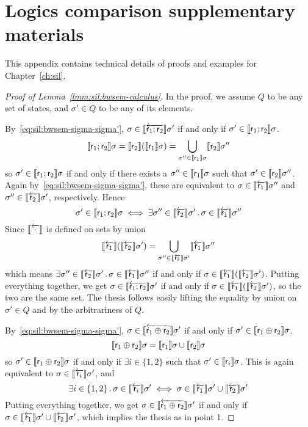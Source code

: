 
\chapter{Logics comparison supplementary materials}\label{ch:app:sil}
This appendix contains technical details of proofs and examples for Chapter~\ref{ch:sil}.

\begin{proof}[Proof of Lemma~\ref{lmm:sil:bwsem-calculus}]
	In the proof, we assume $Q$ to be any set of states, and $\sigma' \in Q$ to be any of its elements.

	By~\eqref{eq:sil:bwsem-sigma-sigma'}, $\sigma \in \llbracket\overleftarrow{\mathsf{r}_1; \mathsf{r}_2}\rrbracket \sigma'$ if and only if $\sigma' \in \llbracket\mathsf{r}_1; \mathsf{r}_2\rrbracket \sigma$.
	\[
	\llbracket\mathsf{r}_1; \mathsf{r}_2\rrbracket \sigma = \llbracket\mathsf{r}_2\rrbracket (\llbracket\mathsf{r}_1\rrbracket \sigma) = \bigcup\limits_{\sigma'' \in \llbracket\mathsf{r}_1\rrbracket \sigma} \llbracket\mathsf{r}_2\rrbracket \sigma''
	\]
	so $\sigma' \in \llbracket\mathsf{r}_1; \mathsf{r}_2\rrbracket \sigma$ if and only if there exists a $\sigma'' \in \llbracket\mathsf{r}_1\rrbracket \sigma$ such that $\sigma' \in \llbracket\mathsf{r}_2\rrbracket \sigma''$. Again by~\eqref{eq:sil:bwsem-sigma-sigma'}, these are equivalent to $\sigma \in \llbracket\overleftarrow{\mathsf{r}_1}\rrbracket \sigma''$ and $\sigma'' \in \llbracket\overleftarrow{\mathsf{r}_2}\rrbracket \sigma'$, respectively. Hence
	\[
	\sigma' \in \llbracket\mathsf{r}_1; \mathsf{r}_2\rrbracket \sigma \iff \exists \sigma'' \in \llbracket\overleftarrow{\mathsf{r}_2}\rrbracket \sigma' \,.\, \sigma \in \llbracket\overleftarrow{\mathsf{r}_1}\rrbracket \sigma''
	\]
	Since $\llbracket\overleftarrow{\cdot}\rrbracket$ is defined on sets by union
	\[
	\llbracket\overleftarrow{\mathsf{r}_1}\rrbracket (\llbracket\overleftarrow{\mathsf{r}_2}\rrbracket \sigma') = \bigcup\limits_{\sigma'' \in \llbracket\overleftarrow{\mathsf{r}_2}\rrbracket \sigma'} \llbracket\overleftarrow{\mathsf{r}_1}\rrbracket \sigma''
	\]
	which means $\exists \sigma'' \in \llbracket\overleftarrow{\mathsf{r}_2}\rrbracket \sigma' \,.\, \sigma \in \llbracket\overleftarrow{\mathsf{r}_1}\rrbracket \sigma''$ if and only if $\sigma \in \llbracket\overleftarrow{\mathsf{r}_1}\rrbracket (\llbracket\overleftarrow{\mathsf{r}_2}\rrbracket \sigma')$.
	Putting everything together, we get $\sigma \in \llbracket\overleftarrow{\mathsf{r}_1; \mathsf{r}_2}\rrbracket \sigma'$ if and only if $\sigma \in \llbracket\overleftarrow{\mathsf{r}_1}\rrbracket (\llbracket\overleftarrow{\mathsf{r}_2}\rrbracket \sigma')$, so the two are the same set. The thesis follows easily lifting the equality by union on $\sigma' \in Q$ and by the arbitrariness of $Q$.

	By~\eqref{eq:sil:bwsem-sigma-sigma'}, $\sigma \in \llbracket\overleftarrow{\mathsf{r}_1 \oplus \mathsf{r}_2}\rrbracket \sigma'$ if and only if $\sigma' \in \llbracket\mathsf{r}_1 \oplus \mathsf{r}_2\rrbracket \sigma$.
	\[
	\llbracket\mathsf{r}_1 \oplus \mathsf{r}_2\rrbracket \sigma = \llbracket\mathsf{r}_1\rrbracket \sigma \cup \llbracket\mathsf{r}_2\rrbracket \sigma
	\]
	so $\sigma' \in \llbracket\mathsf{r}_1 \oplus \mathsf{r}_2\rrbracket \sigma$ if and only if $\exists i \in \{ 1, 2 \}$ such that $\sigma' \in \llbracket\mathsf{r}_i\rrbracket \sigma$. This is again equivalent to $\sigma \in \llbracket\overleftarrow{\mathsf{r}_i}\rrbracket \sigma'$, and
	\[
	\exists i \in \{ 1, 2 \} \,.\, \sigma \in \llbracket\overleftarrow{\mathsf{r}_i}\rrbracket \sigma' \iff \sigma \in \llbracket\overleftarrow{\mathsf{r}_1}\rrbracket \sigma' \cup \llbracket\overleftarrow{\mathsf{r}_2}\rrbracket \sigma'
	\]
	Putting everything together, we get $\sigma \in \llbracket\overleftarrow{\mathsf{r}_1 \oplus \mathsf{r}_2}\rrbracket \sigma'$ if and only if $\sigma \in \llbracket\overleftarrow{\mathsf{r}_1}\rrbracket \sigma' \cup \llbracket\overleftarrow{\mathsf{r}_2}\rrbracket \sigma'$, which implies the thesis as in point 1.


\end{proof}
